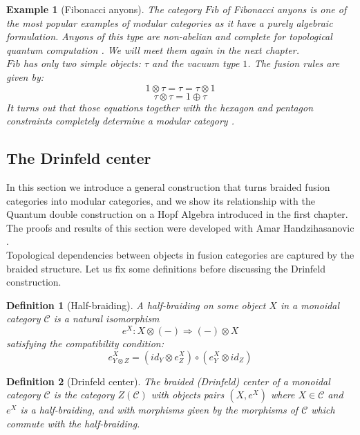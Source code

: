 \documentclass{article}
\newtheorem{definition}{Definition}
\newtheorem{example}{Example}
\newcommand{\cat}{\mathcal{C}}
\begin{document}
\begin{example}[Fibonacci anyons]
	The category $Fib$ of Fibonacci anyons is one of the most popular examples of modular categories as it have a purely algebraic formulation. Anyons of this type are non-abelian and complete for topological quantum computation \cite{Panangaden11}. We will meet them again in the next chapter.\\
	$Fib$ has only two simple objects: $\tau$ and the vacuum type $1$. The fusion rules are given by:
	$$ 1 \otimes \tau = \tau = \tau \otimes 1$$
	$$ \tau \otimes \tau = 1 \oplus \tau $$ 
	It turns out that those equations together with the hexagon and pentagon constraints completely determine a modular category \cite{Simon16}.
\end{example}


\subsection{The Drinfeld center}\label{Thedrinfeldcenter}
In this section we introduce a general construction that turns braided fusion categories into modular categories, and we show its relationship with the Quantum double construction on a Hopf Algebra introduced in the first chapter.
The proofs and results of this section were developed with Amar Handzihasanovic \cite{Handzihasanovic}.\\
Topological dependencies between objects in fusion categories are captured by the braided structure. Let us fix some definitions before discussing the Drinfeld construction.
\begin{definition}[Half-braiding]
	A half-braiding on some object $X$ in a monoidal category $\cat$ is a natural isomorphism 
	$$ e^X : X \otimes (-) \Rightarrow (-) \otimes X$$
	satisfying the compatibility condition:
	$$e^X_{Y \otimes Z} = (id_Y \otimes e^X_Z) \circ ( e^X_Y \otimes id_Z) $$ 
\end{definition}
\begin{definition}[Drinfeld center]
	The braided (Drinfeld) center of a monoidal category $\mathcal{C}$ is the category $Z(\mathcal{C})$ with objects pairs $(X,e^X)$ where $X \in \mathcal{C}$ and $e^X$ is a half-braiding, and with morphisms given by the morphisms of $\mathcal{C}$ which commute with the half-braiding.
\end{definition}
\end{document}

